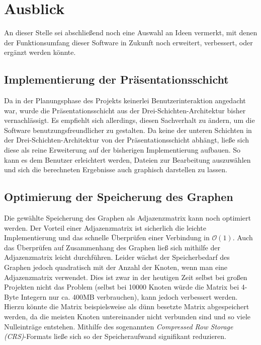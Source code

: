 \chapter{Ausblick}
\label{Ausblick}

An dieser Stelle sei abschlie{\ss}end noch eine Auswahl an Ideen
vermerkt, mit denen der
Funktionsumfang dieser Software in Zukunft noch erweitert, verbessert,
oder erg\"anzt werden k\"onnte.

\section{Implementierung der Pr\"asentationsschicht}

Da in der Planungsphase des Projekts keinerlei Benutzerinteraktion
angedacht war, wurde die Pr\"asentationsschicht aus der
Drei-Schichten-Architektur bisher vernachl\"assigt. Es empfiehlt sich
allerdings, diesen Sachverhalt zu \"andern, um die Software
benutzungsfreundlicher zu gestalten. Da keine der unteren Schichten in
der Drei-Schichten-Architektur von der Pr\"asentationsschicht
abh\"angt, lie{\ss}e sich diese als reine Erweiterung
auf der bisherigen Implementierung aufbauen. So kann es dem Benutzer
erleichtert werden, Dateien zur Bearbeitung auszuw\"ahlen und sich die
berechneten Ergebnisse auch graphisch darstellen zu lassen.

\section{Optimierung der Speicherung des Graphen}

Die gew\"ahlte Speicherung des Graphen als Adjazenzmatrix kann noch
optimiert werden. Der Vorteil einer Adjazenzmatrix ist sicherlich die
leichte Implementierung und das schnelle \"Uberpr\"ufen einer
Verbindung in \(\mathcal{O}(1)\). Auch das \"Uberpr\"ufen auf
Zusammenhang des Graphen lie{\ss} sich mithilfe der Adjazenzmatrix
leicht durchf\"uhren. Leider w\"achst der Speicherbedarf des Graphen
jedoch quadratisch mit der Anzahl der Knoten, wenn man eine
Adjazenzmatrix verwendet. Dies ist zwar in der heutigen Zeit selbst bei
gro{\ss}en Projekten nicht das Problem (selbst bei 10000 Knoten
w\"urde die Matrix bei 4-Byte Integern nur ca. 400MB verbrauchen),
kann jedoch verbessert werden. Hierzu k\"onnte die Matrix
beispielsweise als d\"unn besetzte Matrix abgespeichert
werden, da die meisten Knoten untereinander nicht verbunden sind und
so viele Nulleintr\"age entstehen. Mithilfe des sogenannten \textit{Compressed Row
  Storage (CRS)}-Formats lie{\ss}e sich so der Speicheraufwand signifikant
reduzieren.

